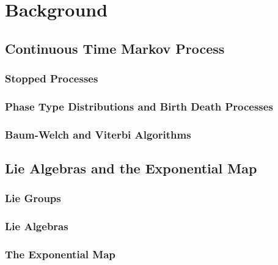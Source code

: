 \chapter{Background}
\section{Continuous Time Markov Process}
\subsection{Stopped Processes}
\subsection{Phase Type Distributions and Birth Death Processes}
\subsection{Baum-Welch and Viterbi Algorithms}
\section{Lie Algebras and the Exponential Map}
\subsection{Lie Groups}
\subsection{Lie Algebras}
\subsection{The Exponential Map}
